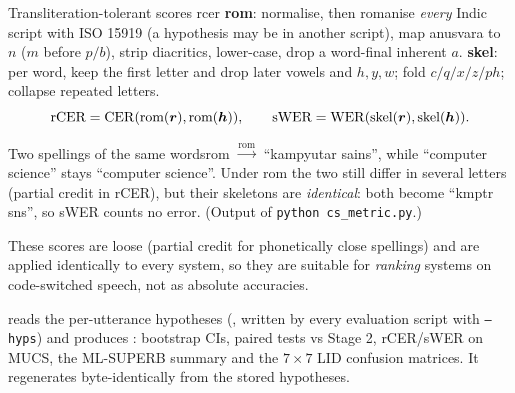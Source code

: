 \begin{definition}{Transliteration-tolerant scores }{rcer}
\textbf{rom}: normalise, then romanise \emph{every} Indic script with ISO 15919 (a hypothesis may be in another script), map anusvara
to $n$ ($m$ before $p/b$), strip diacritics, lower-case, drop a word-final inherent $a$.
\textbf{skel}: per word, keep the first letter and drop later vowels and $h,y,w$; fold $c/q/x/z/ph$; collapse repeated letters.
\[
\text{rCER}=\operatorname{CER}(\text{rom}(\bm r),\text{rom}(\bm h)),\qquad \text{sWER}=\operatorname{WER}(\text{skel}(\bm r),\text{skel}(\bm h)).
\]
\end{definition}

\begin{example}{Two spellings of the same words}{rom}
 $\xrightarrow{\text{rom}}$ ``kampyutar sains'', while ``computer science'' stays ``computer science''.
Under rom the two still differ in several letters (partial credit in rCER), but their skeletons are \emph{identical}: both
become ``kmptr sns'', so sWER counts no error. (Output of \texttt{python cs\_metric.py}.)
\end{example}

These scores are loose (partial credit for phonetically close spellings) and are applied identically to every system, so they are
suitable for \emph{ranking} systems on code-switched speech, not as absolute accuracies.

\begin{incode}
 reads the per-utterance hypotheses (, written by every evaluation script with
\texttt{--hyps}) and produces : bootstrap CIs, paired tests vs Stage 2, rCER/sWER on MUCS, the ML-SUPERB
summary and the $7\times7$ LID confusion matrices. It regenerates byte-identically from the stored hypotheses.
\end{incode}
